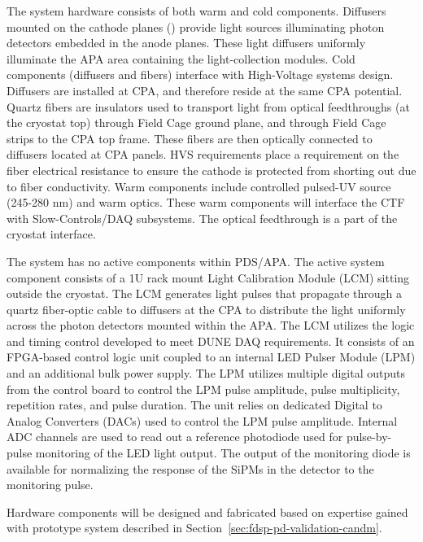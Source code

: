 The system hardware consists of both warm and cold components. Diffusers mounted on the cathode planes () provide light sources illuminating photon detectors embedded in the anode planes. These light diffusers uniformly illuminate the APA area containing the  light-collection modules. Cold components (diffusers and fibers) interface with High-Voltage systems design. 
Diffusers are installed at CPA, and therefore reside at the same CPA potential. 
Quartz fibers are insulators used to transport light from optical feedthroughs (at the cryostat top) through Field Cage ground plane, and through Field Cage strips to the CPA top frame. These fibers are then optically connected to diffusers located at CPA panels. 
HVS requirements place a requirement on the fiber electrical resistance to ensure the cathode is protected from shorting out due to fiber conductivity. 
Warm components include controlled pulsed-UV source (245-280 nm) and warm optics. These warm components will interface the CTF with Slow-Controls/DAQ subsystems. The optical feedthrough is a part of the cryostat interface.

The system has no active components within PDS/APA. The active system component consists of a 1U rack mount
Light Calibration Module (LCM) sitting outside the cryostat. The LCM generates light pulses that propagate through a quartz fiber-optic cable to diffusers at the CPA to distribute the light uniformly across the photon detectors mounted within the APA.
The LCM utilizes the logic and timing control developed to meet DUNE DAQ requirements. It consists of an FPGA-based control logic unit coupled to an internal LED Pulser Module (LPM) and an additional bulk power supply. The LPM utilizes multiple digital outputs from the control board to control the LPM pulse
amplitude, pulse multiplicity, repetition rates, and pulse duration. The unit relies on dedicated Digital to Analog Converters (DACs) used to control the LPM pulse amplitude. Internal ADC channels are used to read out a reference photodiode used for pulse-by-pulse monitoring of the LED light output. 
The output of the monitoring diode is available for normalizing the response of the SiPMs in the detector to the monitoring pulse.

Hardware components will be designed and fabricated based on expertise gained with  prototype system described in Section~\ref{sec:fdsp-pd-validation-candm}.

